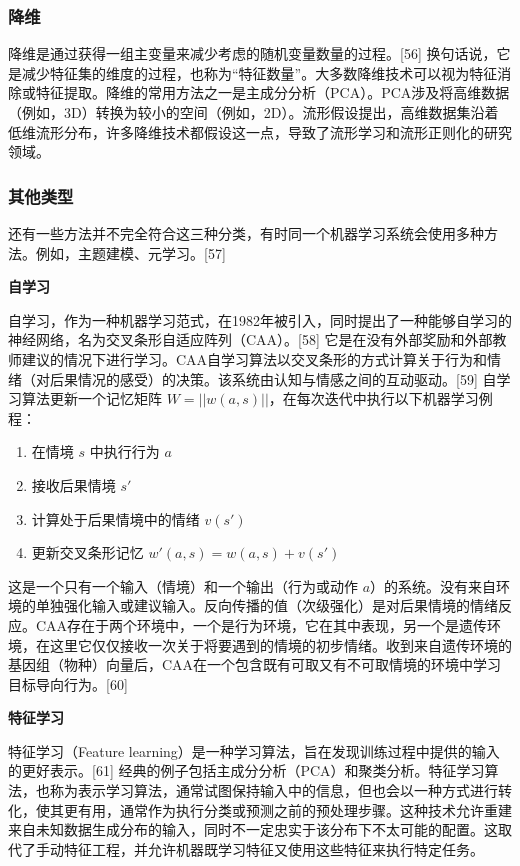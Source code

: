 \subsubsection{降维}
降维是通过获得一组主变量来减少考虑的随机变量数量的过程。[56] 换句话说，它是减少特征集的维度的过程，也称为“特征数量”。大多数降维技术可以视为特征消除或特征提取。降维的常用方法之一是主成分分析（PCA）。PCA涉及将高维数据（例如，3D）转换为较小的空间（例如，2D）。流形假设提出，高维数据集沿着低维流形分布，许多降维技术都假设这一点，导致了流形学习和流形正则化的研究领域。
\subsubsection{其他类型}
还有一些方法并不完全符合这三种分类，有时同一个机器学习系统会使用多种方法。例如，主题建模、元学习。[57]

\textbf{自学习}

自学习，作为一种机器学习范式，在1982年被引入，同时提出了一种能够自学习的神经网络，名为交叉条形自适应阵列（CAA）。[58] 它是在没有外部奖励和外部教师建议的情况下进行学习。CAA自学习算法以交叉条形的方式计算关于行为和情绪（对后果情况的感受）的决策。该系统由认知与情感之间的互动驱动。[59] 自学习算法更新一个记忆矩阵 \( W = ||w(a,s)|| \)，在每次迭代中执行以下机器学习例程：
\begin{enumerate}
\item 在情境 \( s \) 中执行行为 \( a \)
\item 接收后果情境 \( s' \)
\item 计算处于后果情境中的情绪 \( v(s') \)
\item 更新交叉条形记忆 \( w'(a,s) = w(a,s) + v(s') \)
\end{enumerate}
这是一个只有一个输入（情境）和一个输出（行为或动作 \( a \)）的系统。没有来自环境的单独强化输入或建议输入。反向传播的值（次级强化）是对后果情境的情绪反应。CAA存在于两个环境中，一个是行为环境，它在其中表现，另一个是遗传环境，在这里它仅仅接收一次关于将要遇到的情境的初步情绪。收到来自遗传环境的基因组（物种）向量后，CAA在一个包含既有可取又有不可取情境的环境中学习目标导向行为。[60]

\textbf{特征学习}

特征学习（Feature learning）是一种学习算法，旨在发现训练过程中提供的输入的更好表示。[61] 经典的例子包括主成分分析（PCA）和聚类分析。特征学习算法，也称为表示学习算法，通常试图保持输入中的信息，但也会以一种方式进行转化，使其更有用，通常作为执行分类或预测之前的预处理步骤。这种技术允许重建来自未知数据生成分布的输入，同时不一定忠实于该分布下不太可能的配置。这取代了手动特征工程，并允许机器既学习特征又使用这些特征来执行特定任务。

